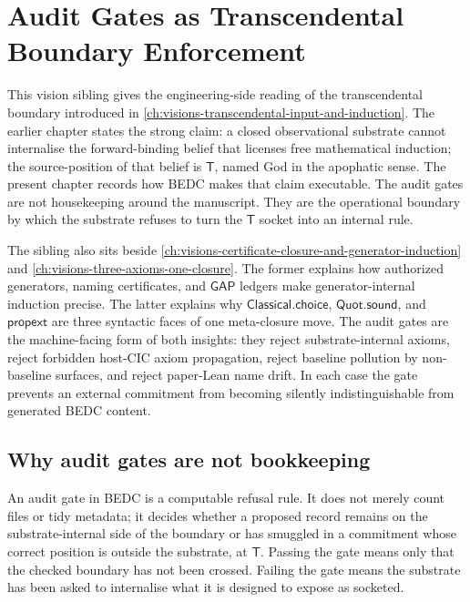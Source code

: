 \chapter{Audit Gates as Transcendental Boundary Enforcement}
\label{ch:visions-audit-gates-as-transcendental-boundary}

This vision sibling gives the engineering-side reading of the transcendental boundary introduced in \autoref{ch:visions-transcendental-input-and-induction}. The earlier chapter states the strong claim: a closed observational substrate cannot internalise the forward-binding belief that licenses free mathematical induction; the source-position of that belief is $\mathsf{T}$, named God in the apophatic sense. The present chapter records how BEDC makes that claim executable. The audit gates are not housekeeping around the manuscript. They are the operational boundary by which the substrate refuses to turn the $\mathsf{T}$ socket into an internal rule.

The sibling also sits beside \autoref{ch:visions-certificate-closure-and-generator-induction} and \autoref{ch:visions-three-axioms-one-closure}. The former explains how authorized generators, naming certificates, and $\mathsf{GAP}$ ledgers make generator-internal induction precise. The latter explains why $\mathsf{Classical.choice}$, $\mathsf{Quot.sound}$, and $\mathsf{propext}$ are three syntactic faces of one meta-closure move. The audit gates are the machine-facing form of both insights: they reject substrate-internal axioms, reject forbidden host-CIC axiom propagation, reject baseline pollution by non-baseline surfaces, and reject paper-Lean name drift. In each case the gate prevents an external commitment from becoming silently indistinguishable from generated BEDC content.

\section{Why audit gates are not bookkeeping}
\label{sec:audit-gates-not-bookkeeping}

\begin{principle}
\label{prin:audit-gates-boundary-enforcement}
An audit gate in BEDC is a computable refusal rule. It does not merely count files or tidy metadata; it decides whether a proposed record remains on the substrate-internal side of the boundary or has smuggled in a commitment whose correct position is outside the substrate, at $\mathsf{T}$. Passing the gate means only that the checked boundary has not been crossed. Failing the gate means the substrate has been asked to internalise what it is designed to expose as socketed.
\end{principle}

